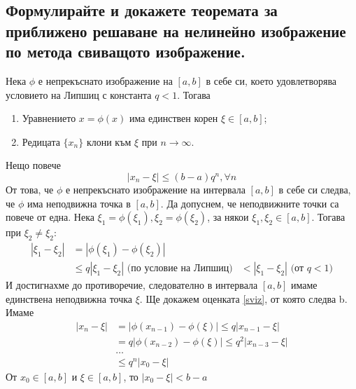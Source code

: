 \documentclass[12pt]{article}
\numberwithin{equation}{subsection}
\numberwithin{theorem}{subsection}
\numberwithin{definition}{subsection}
\numberwithin{corollary}{subsection}
\begin{document}
\subsection{Формулирайте и докажете теоремата за приближено решаване
на нелинейно изображение по метода свиващото изображение.}
  \theorem Нека $\phi$ е непрекъснато изображение на $[a,b]$ в себе си, което удовлетворява условието на Липшиц с константа $q<1$. Тогава
  \begin{enumerate}[a]
    \item{Уравнението $x=\phi(x)$ има единствен корен $\xi\in[a,b]$;}
    \item{Редицата $\{x_n\}$ клони към $\xi$ при $n\rightarrow\infty$.}
  \end{enumerate}
  Нещо повече
  \begin{equation}\label{sviz}
    |x_n-\xi|\leq(b-a)q^n, \forall n
  \end{equation}
  \proof
    От това, че $\phi$ е непрекъснато изображение на интервала $[a,b]$ в себе си следва, че $\phi$ има неподвижна точка в $[a,b].$
    Да допуснем, че неподвижните точки са повече от една. Нека $\xi_1=\phi(\xi_1),\xi_2=\phi(\xi_2)$, за някои $\xi_1,\xi_2\in[a,b]$. Тогава при $\xi_2\neq\xi_2$:
    \begin{align*}
      |\xi_1-\xi_2|&=|\phi(\xi_1)-\phi(\xi_2)|\\
                   &\leq q|\xi_1-\xi_2|\text{ (по условие на Липшиц)}
                   &<|\xi_1-\xi_2|\text{ (от $q<1$)}
    \end{align*}
    И достигнахме до противоречие, следователно в интервала $[a,b]$ имаме единствена неподвижна точка $\xi$.
    Ще докажем оценката \ref{sviz}, от която следва b. Имаме
    \begin{align*}
      |x_n - \xi|&=|\phi(x_{n-1})-\phi(\xi)|\leq q|x_{n-1}-\xi|\\
                 &=q|\phi(x_{n-2})-\phi(\xi)|\leq q^2|x_{n-3}-\xi|\\
                 &\ldots\\
                 &\leq q^n|x_0-\xi|
    \end{align*}
    От $x_0\in[a,b]$ и $\xi\in[a,b]$, то $|x_0-\xi|<b-a$
\end{document}

